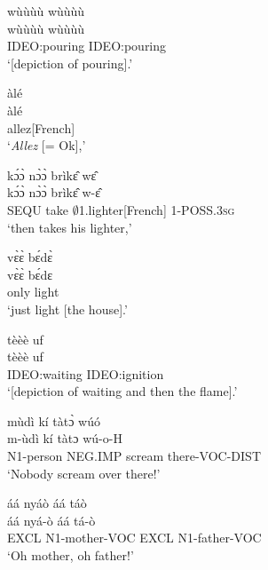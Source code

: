 \begin{exe} 
\exN\label{168}
  \glll wùùùù wùùùù \\
      wùùùù wùùùù \\
        IDEO:pouring IDEO:pouring \\
    \trans `[depiction of pouring].'
\end{exe}

\begin{exe} 
\exN\label{169}
  \glll àlé  \\
       àlé  \\
        allez[French] \\
    \trans `{\itshape Allez} [= Ok],'
\end{exe}

\begin{exe} 
\exN\label{170}
  \glll kɔ́ɔ̀ nɔ̀ɔ̀ brìkɛ̂ wɛ̂ \\
        kɔ́ɔ̀ nɔ̀ɔ̀ brìkɛ̂ w-ɛ̂ \\
      SEQU  take $\emptyset$1.lighter[French] 1-POSS.3\textsc{sg} \\
    \trans `then takes his lighter,'
\end{exe}

\begin{exe} 
\exN\label{171}
  \glll vɛ̀ɛ̀ bɛ́dɛ̀ \\
       vɛ̀ɛ̀ bɛ́dɛ \\
       only light  \\
    \trans `just light [the house].'
\end{exe}

\begin{exe} 
\exN\label{172}
  \glll tèèè uf \\
       tèèè uf \\
       IDEO:waiting IDEO:ignition  \\
    \trans `[depiction of waiting and then the flame].'
\end{exe}

\begin{exe} 
\exN\label{173} 
  \glll mùdì kí tàtɔ̀ wúó \\
       m-ùdì kí tàtɔ wú-o-H \\
        N1-person NEG.IMP scream there-VOC-DIST \\
    \trans `Nobody scream over there!'
\end{exe}

\begin{exe} 
\exN\label{174}
  \glll áá nyáò áá táò \\
       áá nyá-ò áá tá-ò \\
       EXCL N1-mother-VOC EXCL N1-father-VOC  \\
    \trans `Oh mother, oh father!'
\end{exe}

